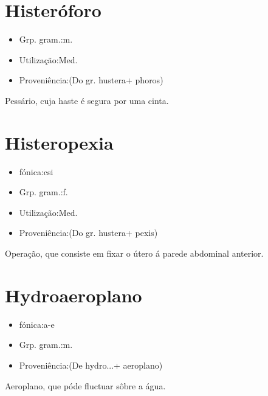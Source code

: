 \documentclass{article}
\begin{document}
\section{Histeróforo}
\begin{itemize}
\item {Grp. gram.:m.}
\end{itemize}
\begin{itemize}
\item {Utilização:Med.}
\end{itemize}
\begin{itemize}
\item {Proveniência:(Do gr. \textunderscore hustera\textunderscore  + \textunderscore phoros\textunderscore )}
\end{itemize}
Pessário, cuja haste é segura por uma cinta.
\section{Histeropexia}
\begin{itemize}
\item {fónica:csi}
\end{itemize}
\begin{itemize}
\item {Grp. gram.:f.}
\end{itemize}
\begin{itemize}
\item {Utilização:Med.}
\end{itemize}
\begin{itemize}
\item {Proveniência:(Do gr. \textunderscore hustera\textunderscore  + \textunderscore pexis\textunderscore )}
\end{itemize}
Operação, que consiste em fixar o útero á parede abdominal anterior.
\section{Hydroaeroplano}
\begin{itemize}
\item {fónica:a-e}
\end{itemize}
\begin{itemize}
\item {Grp. gram.:m.}
\end{itemize}
\begin{itemize}
\item {Proveniência:(De \textunderscore hydro...\textunderscore  + \textunderscore aeroplano\textunderscore )}
\end{itemize}
Aeroplano, que póde fluctuar sôbre a água.
\end{document}
